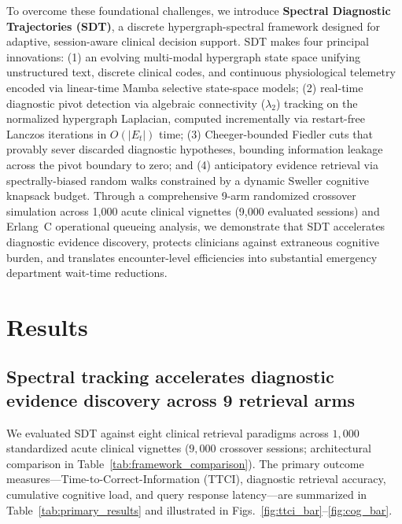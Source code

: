 \documentclass[12pt]{article}
\begin{document}
To overcome these foundational challenges, we introduce \textbf{Spectral Diagnostic Trajectories (SDT)}, a discrete hypergraph-spectral framework designed for adaptive, session-aware clinical decision support. SDT makes four principal innovations: (1) an evolving multi-modal hypergraph state space unifying unstructured text, discrete clinical codes, and continuous physiological telemetry encoded via linear-time Mamba selective state-space models\cite{gu2023mamba}; (2) real-time diagnostic pivot detection via algebraic connectivity ($\lambda_2$) tracking on the normalized hypergraph Laplacian, computed incrementally via restart-free Lanczos iterations in $O(|E_t|)$ time; (3) Cheeger-bounded Fiedler cuts that provably sever discarded diagnostic hypotheses, bounding information leakage across the pivot boundary to zero; and (4) anticipatory evidence retrieval via spectrally-biased random walks constrained by a dynamic Sweller cognitive knapsack budget. Through a comprehensive 9-arm randomized crossover simulation across 1,000 acute clinical vignettes (9,000 evaluated sessions) and Erlang~C operational queueing analysis, we demonstrate that SDT accelerates diagnostic evidence discovery, protects clinicians against extraneous cognitive burden, and translates encounter-level efficiencies into substantial emergency department wait-time reductions.

\section*{Results}

\subsection*{Spectral tracking accelerates diagnostic evidence discovery across 9 retrieval arms}

We evaluated SDT against eight clinical retrieval paradigms across $1{,}000$ standardized acute clinical vignettes ($9{,}000$ crossover sessions; architectural comparison in Table~\ref{tab:framework_comparison}). The primary outcome measures—Time-to-Correct-Information (TTCI), diagnostic retrieval accuracy, cumulative cognitive load, and query response latency—are summarized in Table~\ref{tab:primary_results} and illustrated in Figs.~\ref{fig:ttci_bar}--\ref{fig:cog_bar}.
\end{document}
